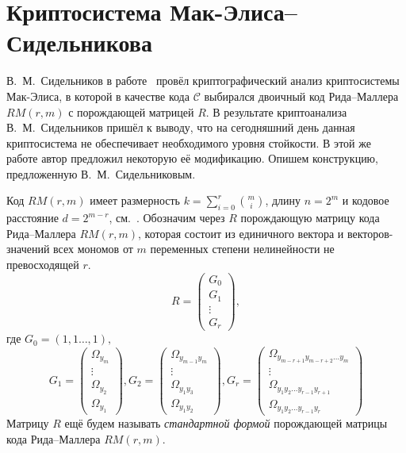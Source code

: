 
\section{Криптосистема Мак-Элиса--Сидельникова}
В.~М.~Сидельников в работе~\cite{Sidelnikov1} провёл
криптографический анализ криптосистемы Мак-Элиса, в которой в
качестве кода $\mathcal{C}$ выбирался двоичный код Рида--Маллера
$RM(r,m)$ с порождающей матрицей $R$. В результате криптоанализа
В.~М.~Сидельников пришёл к выводу, что на сегодняшний день данная
криптосистема не обеспечивает необходимого уровня стойкости. В
этой же работе автор предложил некоторую её модификацию. Опишем
конструкцию, предложенную В.~М.~Сидельниковым.

 Код $RM(r,m)$ имеет размерность $k=\sum_{i=0}^{r}\binom{m}{i}$,
длину $n=2^m$ и кодовое расстояние $d=2^{m-r}$,
см.~\cite{McWilliams}. Обозначим через $R$ порождающую матрицу
кода Рида--Маллера $RM(r,m)$, которая состоит из единичного
вектора и векторов-значений всех мономов от $m$ переменных степени
нелинейности не превосходящей $r$.
$$
R=\begin{pmatrix} G_0\\
G_1\\
\vdots\\
G_r
\end{pmatrix},
$$
где $G_0=(1,1\ldots,1),$
$$
G_1=\begin{pmatrix}\Omega_{y_m}\\
\vdots\\
\Omega_{y_2}\\ \Omega_{y_1}
\end{pmatrix},
G_2=\begin{pmatrix}\Omega_{y_{m-1}y_m}\\
\vdots\\
\Omega_{y_1y_3}\\
\Omega_{y_1y_2}
\end{pmatrix},
G_r=\begin{pmatrix}\Omega_{y_{m-r+1}y_{m-r+2}\ldots y_m}\\
\vdots\\
\Omega_{y_1y_2\ldots y_{r-1}y_{r+1}}\\
\Omega_{y_1y_2\ldots y_{r-1}y_r}
\end{pmatrix}
$$
Матрицу $R$ ещё будем называть \emph{стандартной формой}
порождающей матрицы кода Рида--Маллера $RM(r,m)$.


